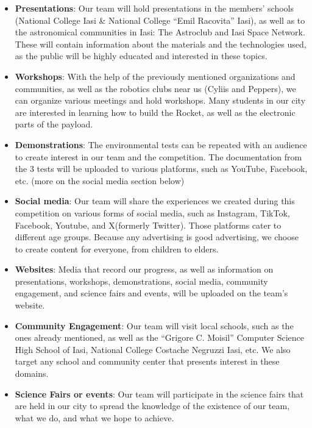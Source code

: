\begin{itemize}

\item \textbf{Presentations}: Our team will hold presentations in the members’ schools (National College Iasi \& National College “Emil Racovita” Iasi), as well as to the astronomical communities in Iasi: The Astroclub and Iasi Space Network. These will contain information about the materials and the technologies used, as the public will be highly educated and interested in these topics.
\item \textbf{Workshops}: With the help of the previously mentioned organizations and communities, as well as the robotics clubs near us (Cyliis and Peppers), we can organize various meetings and hold workshops. Many students in our city are interested in learning how to build the Rocket, as well as the electronic parts of the payload.
\item \textbf{Demonstrations}: The environmental tests can be repeated with an audience to create interest in our team and the competition. The documentation from the 3 tests will be uploaded to various platforms, such as YouTube, Facebook, etc. (more on the social media section below)
\item \textbf{Social media}: Our team will share the experiences we created during this competition on various forms of social media, such as Instagram, TikTok, Facebook, Youtube, and X(formerly Twitter). Those platforms cater to different age groups. Because any advertising is good advertising, we choose to create content for everyone, from children to elders.
\item \textbf{Websites}: Media that record our progress, as well as information on presentations, workshops, demonstrations, social media, community engagement, and science fairs and events, will be uploaded on the team’s website.
\item \textbf{Community Engagement}: Our team will visit local schools, such as the ones already mentioned, as well as the “Grigore C. Moisil” Computer Science High School of Iasi, National College Costache Negruzzi Iasi, etc. We also target any school and community center that presents interest in these domains. 
\item \textbf{Science Fairs or events}: Our team will participate in the science fairs that are held in our city to spread the knowledge of the existence of our team, what we do, and what we hope to achieve. 

\end{itemize}
